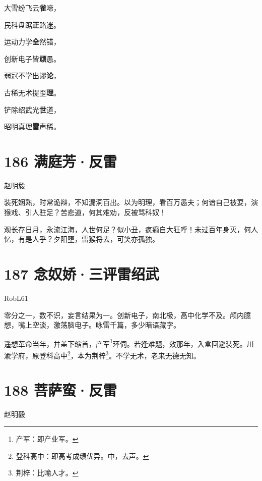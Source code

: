\documentclass[UTF8,12pt,oneside]{ctexbook}
\begin{document}
        \begin{center}
        大雪纷飞云\textbf{雀}啼，

        民科盘踞\textbf{正}路迷。

        运动力学\textbf{全}然错，

        创新电子皆\textbf{顽}愚。

        弱冠不学出谬\textbf{论}，

        古稀无术提歪\textbf{理}。
        
        铲除绍武光\textbf{世}道，
        
        昭明真理\textbf{雷}声稀。
        \end{center}
        
        \newpage

        \section{186 满庭芳·反雷}
        \begin{center}
            赵明毅
        \end{center}
        
        装死娴熟，时常诡辩，不知漏洞百出。以为明理，看百万愚夫；何谙自己被耍，演猴戏、引人驻足？苦悲道，何其难劝，反被骂科奴！
        
        观长存日月，永流江海，人世何足？似小丑，疯癫自大狂呼！未过百年身灭，何人忆，有是人乎？夕阳堕，雷猴将去，可笑亦孤独。
        ~\\

        \section{187 念奴娇·三评雷绍武}
        \begin{center}
            RobL61
        \end{center}
        
        零分之一，数不识，妄言结果为一。创新电子，南北极，高中化学不及。颅内臆想，嘴上空谈，激荡脑电子。咏雷千篇，多少暗语藏字。

        遥想革命当年，井盖下缩首，产军\footnote{产军：即产业军。}环伺。若逢难题，效那年，入盒回避装死。川渝学府，原登科高中\footnote{登科高中：即高考成绩优异。中，去声。}，本为荆梓\footnote{荆梓：比喻人才。}。不学无术，老来无德无知。

        \newpage
        
        \section{188 菩萨蛮·反雷}
        \begin{center}
            赵明毅
        \end{center}
        
\end{document}
